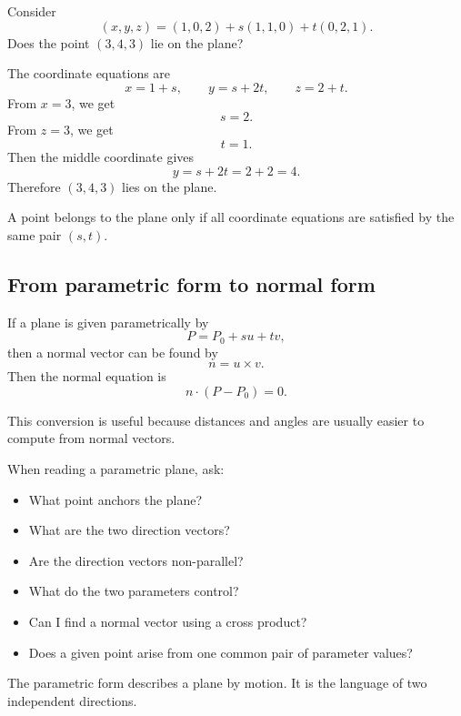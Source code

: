 \begin{examplebox}
Consider
\[
(x,y,z)=(1,0,2)+s(1,1,0)+t(0,2,1).
\]
Does the point \((3,4,3)\) lie on the plane?

The coordinate equations are
\[
x=1+s,
\qquad
 y=s+2t,
\qquad
 z=2+t.
\]
From \(x=3\), we get
\[
s=2.
\]
From \(z=3\), we get
\[
t=1.
\]
Then the middle coordinate gives
\[
y=s+2t=2+2=4.
\]
Therefore \((3,4,3)\) lies on the plane.
\end{examplebox}

A point belongs to the plane only if all coordinate equations are satisfied by the same pair \((s,t)\).

\subsection*{From parametric form to normal form}

If a plane is given parametrically by
\[
P=P_0+s u+t v,
\]
then a normal vector can be found by
\[
n=u\times v.
\]
Then the normal equation is
\[
n\cdot(P-P_0)=0.
\]

This conversion is useful because distances and angles are usually easier to compute from normal vectors.

\begin{summarybox}
When reading a parametric plane, ask:
\begin{itemize}
\item What point anchors the plane?
\item What are the two direction vectors?
\item Are the direction vectors non-parallel?
\item What do the two parameters control?
\item Can I find a normal vector using a cross product?
\item Does a given point arise from one common pair of parameter values?
\end{itemize}
\end{summarybox}

The parametric form describes a plane by motion. It is the language of two independent directions.